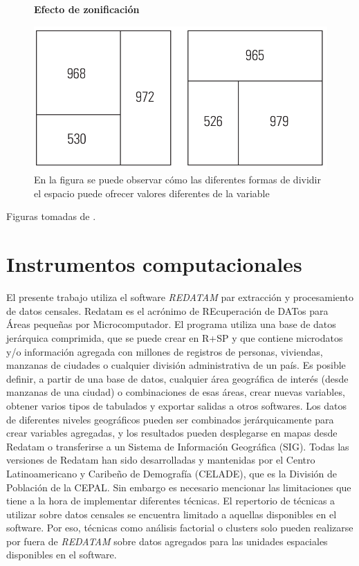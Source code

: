 \begin{figure}[htb]
	\centering
	\textbf{Efecto de zonificación}\par\medskip
	\includegraphics[scale = 0.4]{../img/capitulo3/zonificacion.png}
	\caption{En la figura se puede observar cómo las diferentes formas de dividir el espacio puede ofrecer valores diferentes de la variable}
\end{figure}
	
	Figuras tomadas de \cite{loyd}.
	
	
	\section{Instrumentos computacionales}
	
El presente trabajo utiliza el software \textit{REDATAM} par extracción y procesamiento de datos censales. Redatam es el acrónimo de REcuperación de DATos para Áreas pequeñas por Microcomputador.  El programa utiliza una base de datos jerárquica comprimida, que se puede crear en R+SP y que contiene microdatos y/o información agregada con millones de registros de personas, viviendas, manzanas de ciudades o cualquier división administrativa de un país. Es posible definir, a partir de una base de datos, cualquier área geográfica de interés (desde manzanas de una ciudad) o combinaciones de esas áreas, crear nuevas variables, obtener varios tipos de tabulados y exportar salidas a otros softwares. Los datos de diferentes niveles geográficos pueden ser combinados jerárquicamente para crear variables agregadas, y los resultados pueden desplegarse en mapas desde Redatam o transferirse a un Sistema de Información Geográfica (SIG). Todas las versiones de Redatam han sido desarrolladas y mantenidas por el Centro Latinoamericano y Caribeño de Demografía (CELADE), que es la División de Población de la CEPAL. Sin embargo es necesario mencionar las limitaciones que tiene a la hora de implementar diferentes técnicas. El repertorio de técnicas a utilizar sobre datos censales se encuentra limitado a aquellas disponibles en el software. Por eso, técnicas como análisis factorial o clusters solo pueden realizarse por fuera de \textit{REDATAM} sobre datos agregados para las unidades espaciales disponibles en el software. 


